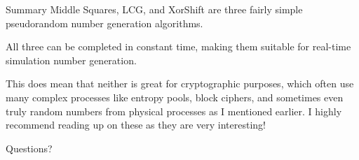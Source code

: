 \documentclass[aspectratio=169]{beamer}
\begin{document}
\begin{frame}{Summary}
Middle Squares, LCG, and XorShift are three fairly simple pseudorandom number generation algorithms. \pause

All three can be completed in constant time, making them suitable for real-time simulation number generation. \pause

This does mean that neither is great for cryptographic purposes, which often use many complex processes like entropy pools, block ciphers, and sometimes even truly random numbers from physical processes as I mentioned earlier. I highly recommend reading up on these as they are very interesting!
\end{frame}

\begin{frame}{}
      \begin{center}
    {\color{sigma@mainblue} \LARGE Questions?}
  \end{center}
\end{frame}
\end{document}
